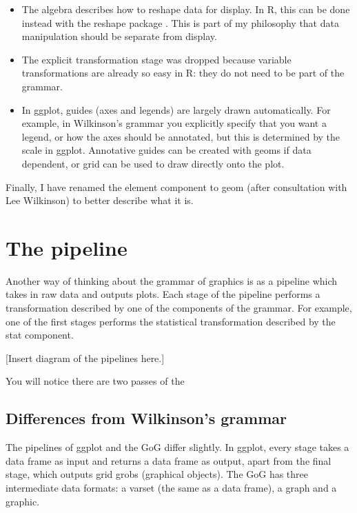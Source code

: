 \begin{itemize}
	\item The algebra describes how to reshape data for display.  In R, this can be done instead with the reshape package \citep{reshape}.  This is part of my philosophy that data manipulation should be separate from display.

	\item The explicit transformation stage was dropped because variable transformations are already so easy in R: they do not need to be part of the grammar.
	
	\item In ggplot, guides (axes and legends) are largely drawn automatically.  For example, in Wilkinson's grammar you explicitly specify that you want a legend, or how the axes should be annotated, but this is determined by the scale in ggplot.  Annotative guides can be created with geoms if data dependent, or grid can be used to draw directly onto the plot.
\end{itemize}

Finally, I have renamed the element component to geom (after consultation with Lee Wilkinson) to better describe what it is.  

\section{The pipeline}\label{sec:the_pipeline}

Another way of thinking about the grammar of graphics is as a pipeline which takes in raw data and outputs plots.  Each stage of the pipeline performs a transformation described by one of the components of the grammar.  For example, one of the first stages performs the statistical transformation described by the stat component.  

[Insert diagram of the pipelines here.]

You will notice there are two passes of the 


\subsection{Differences from Wilkinson's grammar}

The pipelines of ggplot and the GoG differ slightly.  In ggplot, every stage takes a data frame as input and returns a data frame as output, apart from the final stage, which outputs grid grobs (graphical objects).  The GoG has three intermediate data formats: a varset (the same as a data frame), a graph and a graphic.

